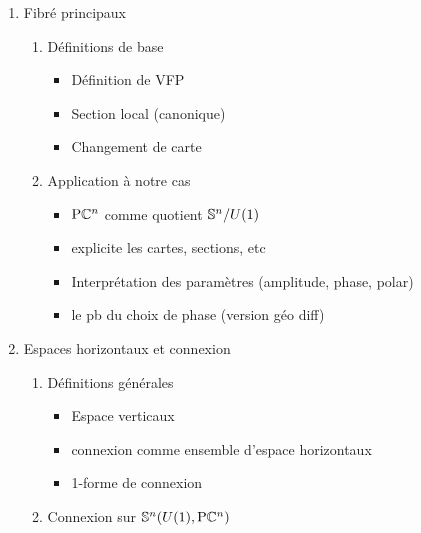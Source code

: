\begin{enumerate}[label=\Roman* --- ]
\begin{enumerate}[label=\arabic{enumi}.\arabic* --- ]
		\item Fibré principaux
		\begin{enumerate}[label=\arabic{enumi}.2.\arabic* --- ]
			
			\item Définitions de base
			\begin{itemize} \normalfont
				
				\item Définition de VFP
				
				\item Section local (canonique)
				
				\item Changement de carte
				
			\end{itemize}
			
			\item Application à notre cas
			\begin{itemize} \normalfont
				
				\item $\PC{n}$ comme quotient $\S{n}/U(1)$
				
				\item explicite les cartes, sections, etc
				
				\item Interprétation des paramètres (amplitude, phase, polar)
				
				\item le pb du choix de phase (version géo diff)
			\end{itemize}
		\end{enumerate}
			
		\item Espaces horizontaux et connexion
		\begin{enumerate}[label=\arabic{enumi}.2.\arabic* --- ]
			
			\item Définitions générales
			\begin{itemize} \normalfont
				
				\item Espace verticaux
				
				\item connexion comme ensemble d'espace horizontaux
				
				\item 1-forme de connexion
			\end{itemize}
			
			\item Connexion sur $\S{n}(U(1), \PC{n})$
			\begin{itemize} \normalfont
				

\end{itemize}
\end{enumerate}
\end{enumerate}
\end{enumerate}
